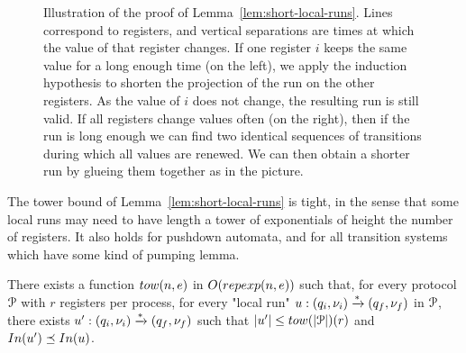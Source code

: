 \fi

\begin{figure}
	
	\caption{Illustration of the proof of Lemma~\ref{lem:short-local-runs}. Lines correspond to registers, and vertical separations are times at which the value of that register changes. If one register $i$ keeps the same value for a long enough time (on the left), we apply the induction hypothesis to shorten the projection of the run on the other registers. As the value of $i$ does not change, the resulting run is still valid. If all registers change values often (on the right), then if the run is long enough we can find two identical sequences of transitions during which all values are renewed. We can then obtain a shorter run by glueing them together as in the picture.}
\end{figure}


\begin{remark}
	The tower bound of Lemma~\ref{lem:short-local-runs} is tight, in the sense that some local runs may need to have length a tower of exponentials of height the number of registers.
	It also holds for pushdown automata, and for all transition systems which have some kind of pumping lemma.
\end{remark}

\begin{lemma}
	\label{lem:short-local-runs}
	There exists a function $\towerfun(n, e)$ in $O(\repexp{n}{e})$ such that, for every protocol $\mathcal{P}$ with $r$ registers per process, for every "local run" $u: (q_i, \nu_i) \xrightarrow{*} (q_f, \nu_f)$ in $\mathcal{P}$, there exists $u': (q_i, \nu_i) \xrightarrow{*} (q_f, \nu_f)$ such that $\length{\localrun'} \leq \towerfun(\size{\prot})(r)$ and $\Input{\localrun'} \subword \Input{\localrun}$. 
\end{lemma}


